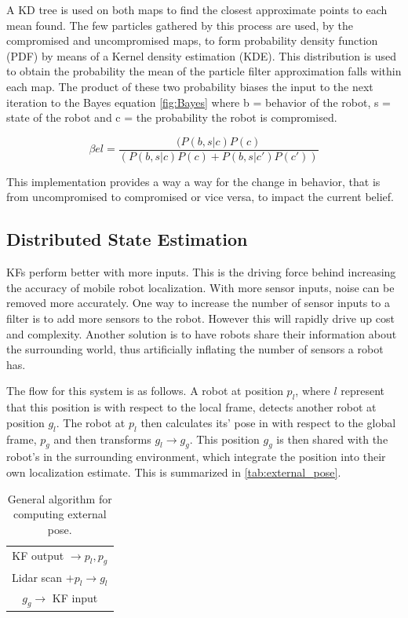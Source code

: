 \documentclass[conference]{IEEEtran}
\begin{document}
A KD tree is used on both maps to find the closest approximate points to each mean found. The few particles gathered by this process are used, by the compromised and uncompromised maps, to form probability density function (PDF) by means of a Kernel density estimation (KDE). This distribution is used to obtain the probability the mean of the particle filter approximation falls within each map. The product of these two probability biases the input to the next iteration to the Bayes equation \ref{fig:Bayes} where b = behavior of the robot, s = state of the robot and c = the probability the robot is compromised.

\begin{equation}
 \beta el =\frac {(P(b,s|c)P(c)} {(P(b,s|c)P(c) + 
 P(b,s|c' )P(c' ))} 
 \label{fig:Bayes}
\end{equation}

This implementation provides a way a way for the change in behavior, that is from uncompromised to compromised or vice versa, to impact the current belief.


\subsection{Distributed State Estimation}
KFs perform better with more inputs. This is the driving force behind increasing the accuracy of mobile robot localization. With more sensor inputs, noise can be removed more accurately. One way to increase the number of sensor inputs to a filter is to add more sensors to the robot. However this will rapidly drive up cost and complexity. Another solution is to have robots share their information about the surrounding world, thus artificially inflating the number of sensors a robot has.

The flow for this system is as follows. A robot at position $p_l$, where $l$ represent that this position is with respect to the local frame, detects another robot at position $g_l$. The robot at $p_l$ then calculates its' pose in with respect to the global frame, $p_g$ and then transforms $g_l \rightarrow g_g$. This position $g_g$ is then shared with the robot's in the surrounding environment, which integrate the position into their own localization estimate. This is summarized in \autoref{tab:external_pose}.

\begin{table}
\centering
\begin{tabular}{c}
KF output $\rightarrow p_l, p_g$ \\
Lidar scan $+ p_l \rightarrow g_l$ \\
$g_g \rightarrow$ KF input
\end{tabular}
\caption{General algorithm for computing external pose.}
\label{tab:external_pose}
\end{table}
\end{document}

